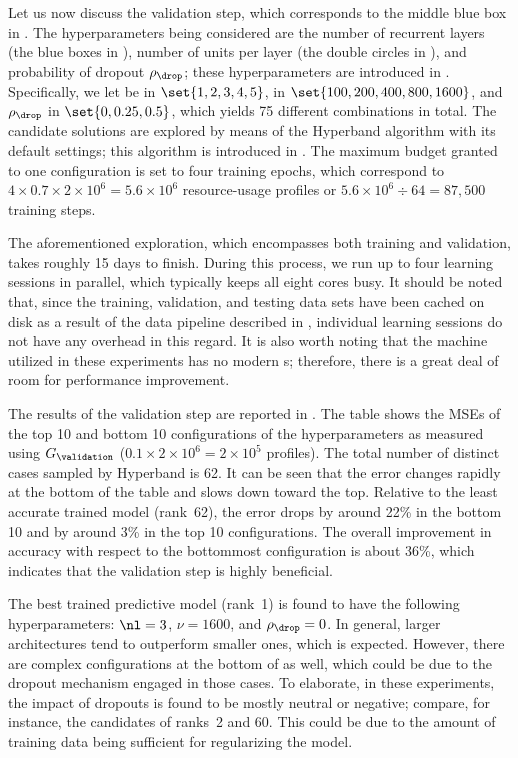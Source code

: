 Let us now discuss the validation step, which corresponds to the middle blue box
in . The hyperparameters being considered are the number of
recurrent layers \nl (the blue boxes in ), number
of units per layer \nu (the double circles in ),
and probability of dropout $\rho_\drop$; these hyperparameters are introduced in
. Specifically, we let \nl be in $\set{1, 2, 3, 4,
5}$, \nu in $\set{100, 200, 400, 800, 1600}$, and $\rho_\drop$ in $\set{0, 0.25,
0.5}$, which yields 75 different combinations in total. The candidate solutions
are explored by means of the Hyperband algorithm with its default settings; this
algorithm is introduced in . The maximum budget
granted to one configuration is set to four training epochs, which correspond to
$4 \times 0.7 \times 2 \times 10^6 = 5.6 \times 10^6$ resource-usage profiles or
$5.6 \times 10^6 \div 64 = 87{,}500$ training steps.

The aforementioned exploration, which encompasses both training and validation,
takes roughly 15 days to finish. During this process, we run up to four learning
sessions in parallel, which typically keeps all eight cores busy. It should be
noted that, since the training, validation, and testing data sets have been
cached on disk as a result of the data pipeline described in
, individual learning sessions do not have any
overhead in this regard. It is also worth noting that the machine utilized in
these experiments has no modern s; therefore, there is a great deal of
room for performance improvement.

The results of the validation step are reported in . The
table shows the \acp{MSE} of the top 10 and bottom 10 configurations of the
hyperparameters as measured using $G_\validation$ ($0.1 \times 2 \times 10^6 = 2
\times 10^5$ profiles). The total number of distinct cases sampled by Hyperband
is 62. It can be seen that the error changes rapidly at the bottom of the table
and slows down toward the top. Relative to the least accurate trained model
(rank~62), the error drops by around 22\% in the bottom 10 and by around 3\% in
the top 10 configurations. The overall improvement in accuracy with respect to
the bottommost configuration is about 36\%, which indicates that the validation
step is highly beneficial.

The best trained predictive model (rank~1) is found to have the following
hyperparameters: $\nl = 3$, $\nu = 1600$, and $\rho_\drop = 0$. In general,
larger architectures tend to outperform smaller ones, which is expected.
However, there are complex configurations at the bottom of
 as well, which could be due to the dropout mechanism
engaged in those cases. To elaborate, in these experiments, the impact of
dropouts is found to be mostly neutral or negative; compare, for instance, the
candidates of ranks~2 and 60. This could be due to the amount of training data
being sufficient for regularizing the model.

